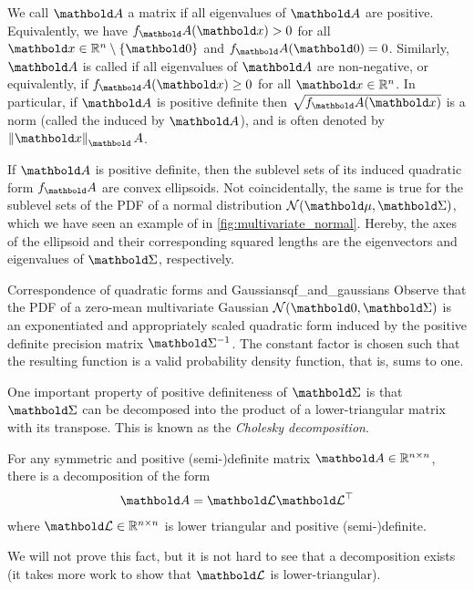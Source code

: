 We call $\mA$ a  matrix if all eigenvalues of $\mA$ are positive.
Equivalently, we have $f_\mA(\vx) > 0$ for all $\vx \in \R^n \setminus \{\vzero\}$ and $f_\mA(\vzero) = 0$.
Similarly, $\mA$ is called  if all eigenvalues of $\mA$ are non-negative, or equivalently, if $f_\mA(\vx) \geq 0$ for all $\vx \in \R^n$.
In particular, if $\mA$ is positive definite then $\sqrt{f_\mA(\vx)}$ is a norm (called the  induced by $\mA$), and is often denoted by $\norm{\vx}_\mA$.

If $\mA$ is positive definite, then the sublevel sets of its induced quadratic form $f_\mA$ are convex ellipsoids.
Not coincidentally, the same is true for the sublevel sets of the PDF of a normal distribution $\N{\vmu}{\mSigma}$, which we have seen an example of in \cref{fig:multivariate_normal}. Hereby, the axes of the ellipsoid and their corresponding squared lengths are the eigenvectors and eigenvalues of $\mSigma$, respectively.

\begin{rmk}{Correspondence of quadratic forms and Gaussians}{qf_and_gaussians}
  Observe that the PDF of a zero-mean multivariate Gaussian $\N{\vzero}{\mSigma}$ is an exponentiated and appropriately scaled quadratic form induced by the positive definite precision matrix $\inv{\mSigma}$.
  The constant factor is chosen such that the resulting function is a valid probability density function, that is, sums to one.
\end{rmk}

One important property of positive definiteness of $\mSigma$ is that $\mSigma$ can be decomposed into the product of a lower-triangular matrix with its transpose.
This is known as the \emph{Cholesky decomposition}.

\begin{fct}
  For any symmetric and positive (semi-)definite matrix $\mA \in \R^{n \times n}$, there is a decomposition of the form \begin{align}
    \mA = \mCalL\transpose{\mCalL} \label{eq:cholesky}
  \end{align} where $\mCalL \in \R^{n \times n}$ is lower triangular and positive (semi-)definite.
\end{fct}

We will not prove this fact, but it is not hard to see that a decomposition exists (it takes more work to show that $\mCalL$ is lower-triangular).

